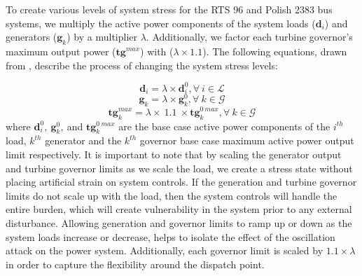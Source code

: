 \documentclass[journal]{IEEEtran}
\begin{document}

To create various levels of system stress for the RTS 96 and Polish 2383 bus systems, we multiply the active power components of the system loads ($\mathbf{d}_i $) and generators ($\mathbf{g}_k $) by a multiplier $\lambda$. Additionally, we factor each turbine governor's maximum output power ($\mathbf{tg}^{max} $) with ($\lambda \times 1.1$). The following equations, drawn from \cite{Anu}, describe the process of changing the system stress levels:

\begin{equation}
\mathbf{d}_i=\lambda \times \mathbf{d}_i^0, \forall ~i \in \mathcal{L}
\end{equation}
\begin{equation}
\mathbf{g}_k=\lambda \times \mathbf{g}_k^0, \forall ~k \in \mathcal{G}
\end{equation}          
\begin{equation}
\mathbf{tg}^{max}_k=\lambda \times~1.1~\times \mathbf{tg}^{0~max}_k, \forall ~k \in \mathcal{G}
\end{equation} 
where $\mathbf{d}_i^0,~ \mathbf{g}_k^0,~$and $\mathbf{tg}^{0~max}_k $ are the base case active power components of the $ i^{th}$ load, $k^{th}$ generator and the $k^{th}$ governor base case maximum active power output limit respectively. It is important to note that by scaling the generator output and turbine governor limits as we scale the load, we create a stress state without placing artificial strain on system controls. If the generation and turbine governor limits do not scale up with the load, then the system controls will handle the entire burden, which will create vulnerability in the system prior to any external disturbance. Allowing generation and governor limits to ramp up or down as the system loads increase or decrease, helps to isolate the effect of the oscillation attack on the power system. Additionally, each governor limit is scaled by $1.1 \times \lambda$ in order to capture the flexibility around the dispatch point.



\end{document}
